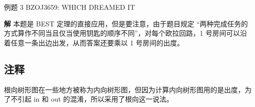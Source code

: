 \begin{NOTE}{例题 3}{}
BZOJ3659: WHICH DREAMED IT

\end{NOTE}


\textbf{解} 本题是 BEST 定理的直接应用，但是要注意，由于题目规定 “两种完成任务的方式算作不同当且仅当使用钥匙的顺序不同”，对每个欧拉回路，1 号房间可以沿着任意一条出边出发，从而答案还要乘以 1 号房间的出度。

\subsection{注释}

根向树形图在一些地方被称为内向树形图，但因为计算内向树形图用的是出度，为了不引起 in 和 out 的混淆，所以采用了根向这一说法。
